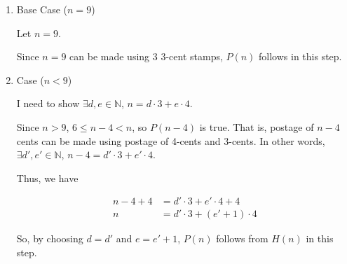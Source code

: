 \documentclass[12pt]{article}
\begin{document}
\begin{itemize}
\begin{mdframed}
\begin{enumerate}[1.]
\begin{mdframed}
        \end{mdframed}

        \item Base Case ($n = 9$)

        \begin{mdframed}
        Let $n = 9$.

        \bigskip

        Since $n = 9$ can be made using 3 3-cent stamps, $P(n)$
        follows in this step.

        \end{mdframed}

        \item Case ($n < 9$)

        I need to show $\exists d,e \in \mathbb{N}$, $n = d \cdot 3 + e \cdot 4$.

        \bigskip

        Since $n > 9$, $6 \leq n - 4 < n$, so $P(n-4)$ is true. That is,
        postage of $n-4$ cents can be made using postage of 4-cents and 3-cents.
        In other words, $\exists d',e' \in \mathbb{N}$, $n-4 = d' \cdot 3 + e' \cdot 4$.

        \bigskip

        Thus, we have

        \begin{align}
            n-4+4 &= d' \cdot 3 + e' \cdot 4 + 4\\
            n &= d' \cdot 3 + (e'+1) \cdot 4
        \end{align}

        \bigskip

        So, by choosing $d = d'$ and $e = e' + 1$, $P(n)$ follows from $H(n)$ in this step.

    \end{enumerate}
    \end{mdframed}
\end{itemize}
\end{document}
